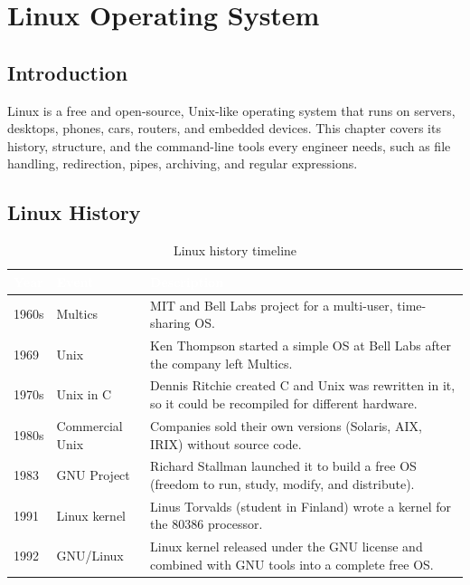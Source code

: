 \chapter{Linux Operating System}

\providecommand{\th}[1]{\textcolor{white}{\textbf{#1}}}
\providecommand{\lb}{\rowcolor{TableLightBlue}}
\setlength{\arrayrulewidth}{1.5pt}

\section{Introduction}
Linux is a free and open-source, Unix-like operating system that runs on servers, desktops, phones, cars, routers, and embedded devices. This chapter covers its history, structure, and the command-line tools every engineer needs, such as file handling, redirection, pipes, archiving, and regular expressions.

\section{Linux History}

\begin{table}[h!]
	\centering
	\renewcommand{\arraystretch}{1.4}
	\begin{tabularx}{\textwidth}{|>{\centering\arraybackslash}p{1.6cm}|>{\raggedright\arraybackslash}p{3.8cm}|>{\raggedright\arraybackslash}X|}
		\hline
		\rowcolor{TableCyan}
		\th{Year} & \th{Event} & \th{Description} \\ \hline
		\lb 1960s & Multics & MIT and Bell Labs project for a multi-user, time-sharing OS. \\ \hline
		\lb 1969 & Unix & Ken Thompson started a simple OS at Bell Labs after the company left Multics. \\ \hline
		\lb 1970s & Unix in C & Dennis Ritchie created C and Unix was rewritten in it, so it could be recompiled for different hardware. \\ \hline
		\lb 1980s & Commercial Unix & Companies sold their own versions (Solaris, AIX, IRIX) without source code. \\ \hline
		\lb 1983 & GNU Project & Richard Stallman launched it to build a free OS (freedom to run, study, modify, and distribute). \\ \hline
		\lb 1991 & Linux kernel & Linus Torvalds (student in Finland) wrote a kernel for the 80386 processor. \\ \hline
		\lb 1992 & GNU/Linux & Linux kernel released under the GNU license and combined with GNU tools into a complete free OS. \\ \hline
	\end{tabularx}
	\caption{Linux history timeline}
	\label{tab:linuxhistory}
\end{table}

